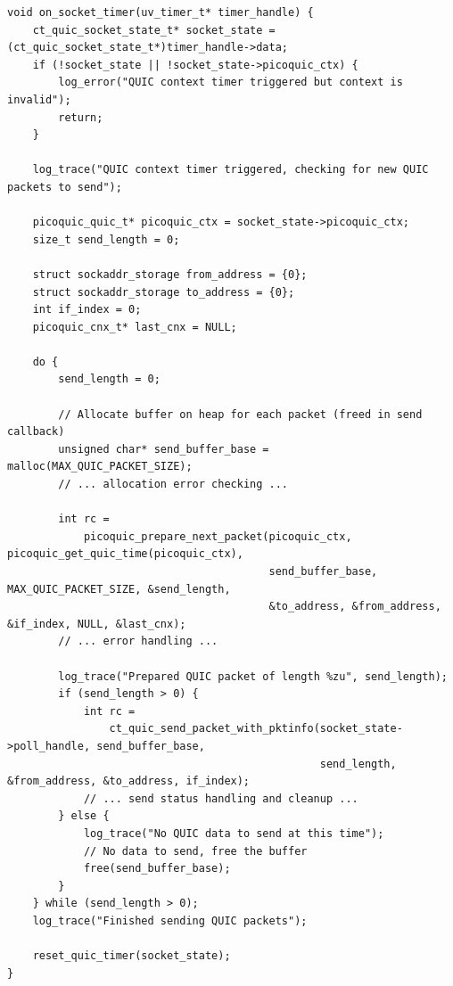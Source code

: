 % 

\begin{listing}[htbp]
    \begin{verbatim}
void on_socket_timer(uv_timer_t* timer_handle) {
    ct_quic_socket_state_t* socket_state = (ct_quic_socket_state_t*)timer_handle->data;
    if (!socket_state || !socket_state->picoquic_ctx) {
        log_error("QUIC context timer triggered but context is invalid");
        return;
    }

    log_trace("QUIC context timer triggered, checking for new QUIC packets to send");

    picoquic_quic_t* picoquic_ctx = socket_state->picoquic_ctx;
    size_t send_length = 0;

    struct sockaddr_storage from_address = {0};
    struct sockaddr_storage to_address = {0};
    int if_index = 0;
    picoquic_cnx_t* last_cnx = NULL;

    do {
        send_length = 0;

        // Allocate buffer on heap for each packet (freed in send callback)
        unsigned char* send_buffer_base = malloc(MAX_QUIC_PACKET_SIZE);
        // ... allocation error checking ...

        int rc =
            picoquic_prepare_next_packet(picoquic_ctx, picoquic_get_quic_time(picoquic_ctx),
                                         send_buffer_base, MAX_QUIC_PACKET_SIZE, &send_length,
                                         &to_address, &from_address, &if_index, NULL, &last_cnx);
        // ... error handling ...

        log_trace("Prepared QUIC packet of length %zu", send_length);
        if (send_length > 0) {
            int rc =
                ct_quic_send_packet_with_pktinfo(socket_state->poll_handle, send_buffer_base,
                                                 send_length, &from_address, &to_address, if_index);
            // ... send status handling and cleanup ...
        } else {
            log_trace("No QUIC data to send at this time");
            // No data to send, free the buffer
            free(send_buffer_base);
        }
    } while (send_length > 0);
    log_trace("Finished sending QUIC packets");

    reset_quic_timer(socket_state);
}
    \end{verbatim}
    \caption[libuv timer callback function]{libuv timer callback function which checks in on Picoquic when required.}
    \label{lst:timer-callback-function}
\end{listing}

